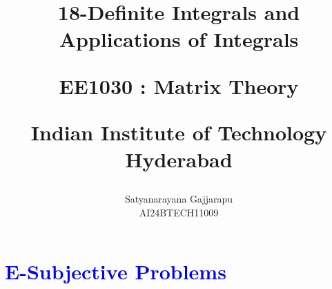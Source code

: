 \documentclass[journal,12pt,twocolumn]{IEEEtran}
\theoremstyle{remark}
\begin{document}
%






\title{
18-Definite Integrals and Applications of Integrals

\large{EE1030 : Matrix Theory}

Indian Institute of Technology Hyderabad
}
\author{Satyanarayana Gajjarapu

AI24BTECH11009
}	





\maketitle

\newpage



\bigskip

\renewcommand{\thefigure}{\theenumi}
\renewcommand{\thetable}{\theenumi}


\section{\large\textcolor{blue}{E-Subjective Problems}}
\vspace{0.5cm}
\end{document}
